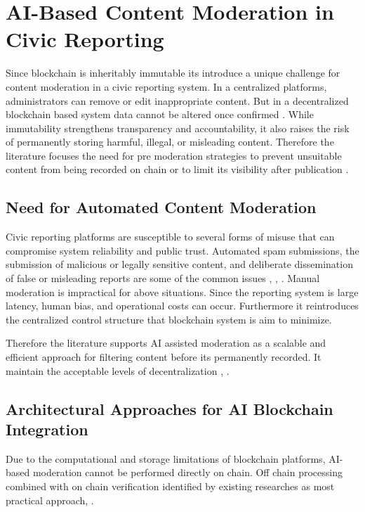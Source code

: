 \section{AI-Based Content Moderation in Civic Reporting}

Since blockchain is inheritably immutable its introduce a unique challenge for content moderation in a civic reporting system. In a centralized platforms, administrators can remove or edit inappropriate content. But in a decentralized blockchain based system data cannot be altered once confirmed \cite{tencentcloud2025moderation}. While immutability strengthens transparency and accountability, it also raises the risk of permanently storing harmful, illegal, or misleading content. Therefore the literature focuses the need for pre moderation strategies to prevent unsuitable content from being recorded on chain or to limit its visibility after publication \cite{dzone2026blockchainai}.

\subsection{Need for Automated Content Moderation}

Civic reporting platforms are susceptible to several forms of misuse that can compromise system reliability and public trust. Automated spam submissions, the submission of malicious or legally sensitive content, and deliberate dissemination of false or misleading reports are some of the common issues \cite{wani2024ai}, \cite{gosztonyi2024theory}, \cite{kolluri2025aipowered}. Manual moderation is impractical for above situations. Since the reporting system is large latency, human bias, and operational costs can occur. Furthermore it reintroduces the centralized control structure that blockchain system is aim to minimize. 

Therefore the literature supports AI assisted moderation as a scalable and  efficient approach for filtering content before its permanently recorded. It maintain the acceptable levels of decentralization \cite{mohammadi2025ai}, \cite{goundar2025blockchain}.

\subsection{Architectural Approaches for AI Blockchain Integration}

Due to the computational and storage limitations of blockchain platforms, AI-based moderation cannot be performed directly on chain. Off chain processing combined with on chain verification identified by existing researches as most practical approach\cite{goundar2025blockchain}, \cite{kader2024enhancing}.  

